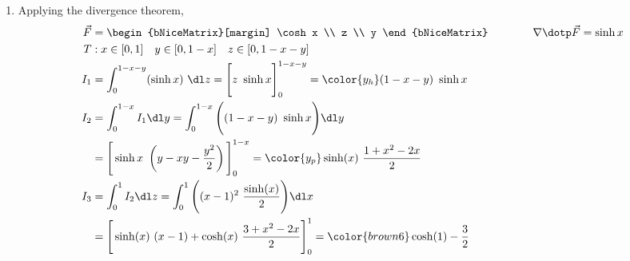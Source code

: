 \begin{enumerate}
     \item Applying the divergence theorem,
           \begin{align}
                \vec{F} & = \begin{bNiceMatrix}[margin]
                                 \cosh x \\ z \\ y
                            \end{bNiceMatrix} \qquad\qquad
                \nabla \dotp \vec{F} = \sinh x                                       \\
                T       & : x \in [0, 1] \quad y \in [0, 1-x] \quad z \in [0, 1-x-y] \\
                I_1     & = \int_{0}^{1-x-y} (\sinh x)\ \dl z
                = \Bigg[ z\ \sinh x \Bigg]_{0}^{1-x-y}
                = {\color{y_h} (1 - x - y)\ \sinh x}                                 \\
                I_2     & = \int_{0}^{1-x}I_1 \dl y = \int_{0}^{1-x}
                \Bigg( (1-x-y)\ \sinh x \Bigg) \dl y                                 \\
                        & = \Bigg[ \sinh x\ \left( y - xy
                     - \frac{y^2}{2} \right) \Bigg]_{0}^{1-x}
                = {\color{y_p} \sinh(x)\ \frac{1+x^2 - 2x}{2}}                       \\
                I_3     & = \int_{0}^{1} I_2 \dl z = \int_{0}^{1}
                \Bigg( (x-1)^2\ \frac{\sinh(x)}{2} \Bigg) \dl x                      \\
                        & = \Bigg[ \sinh(x)\ (x-1) + \cosh(x)\
                     \frac{3 + x^2 - 2x}{2} \Bigg]_0^1
                = {\color{brown6} \cosh(1) - \frac{3}{2}}
           \end{align}


\end{enumerate}
